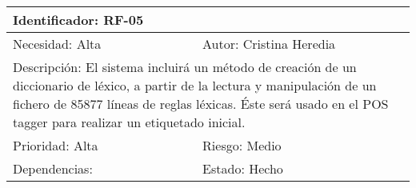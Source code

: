 \begin{table}[H]
\label{my-label}
\begin{tabular}{|l|l|l|l|l|l|l|}
\hline
\multicolumn{7}{|l|}{\textcolor{SchoolColor}{Identificador:} RF-05}                                 \\ \hline
\multicolumn{4}{|l|}{\textcolor{SchoolColor}{Necesidad:} Alta} & \multicolumn{3}{l|}{\textcolor{SchoolColor}{Autor:} Cristina Heredia}         \\ \hline
\multicolumn{7}{|L|}{\textcolor{SchoolColor}{Descripción:} El sistema incluirá un método de creación de un diccionario de léxico, a partir de la lectura y manipulación de un fichero de 85877 líneas de reglas léxicas. Éste será usado en el POS tagger para realizar un etiquetado inicial. }                                 \\ \hline
\multicolumn{4}{|l|}{\textcolor{SchoolColor}{Prioridad: }Alta} & \multicolumn{3}{l|}{\textcolor{SchoolColor}{Riesgo:} Medio}         \\ \hline
\multicolumn{5}{|l|}{\textcolor{SchoolColor}{Dependencias: } }         & \multicolumn{2}{l|}{\textcolor{SchoolColor}{Estado:} Hecho} \\ \hline
\end{tabular}
\end{table}











